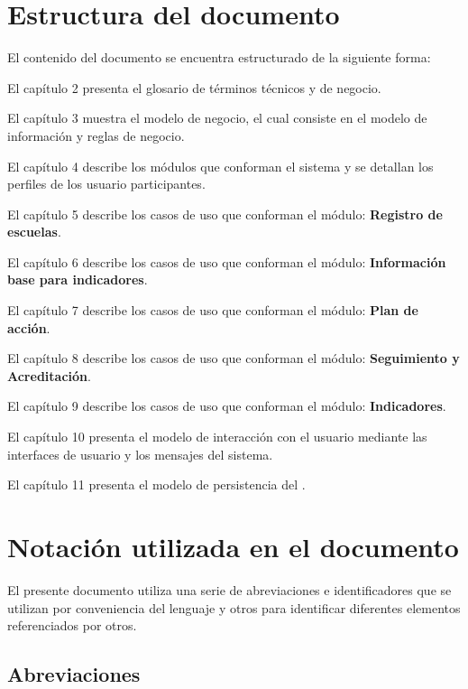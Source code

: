 \section{Estructura del documento}

    El contenido del documento se encuentra estructurado de la siguiente forma:

    \begin{Citemize}
	\item El capítulo 2 presenta el glosario de términos técnicos y de negocio.
	\item El capítulo 3 muestra el modelo de negocio, el cual consiste en el modelo de información y reglas de negocio.
	\item El capítulo 4 describe los módulos que conforman el sistema y se detallan los perfiles de los usuario participantes.
	\item El capítulo 5 describe los casos de uso que conforman el módulo: {\bf Registro de escuelas}.
	\item El capítulo 6 describe los casos de uso que conforman el módulo: {\bf Información base para indicadores}.
	\item El capítulo 7 describe los casos de uso que conforman el módulo: {\bf Plan de acción}.
	\item El capítulo 8 describe los casos de uso que conforman el módulo: {\bf Seguimiento y Acreditación}.
	\item El capítulo 9 describe los casos de uso que conforman el módulo: {\bf Indicadores}.	
	\item El capítulo 10 presenta el modelo de interacción con el usuario mediante las interfaces de usuario y los mensajes del sistema.
	\item El capítulo 11 presenta el modelo de persistencia del \saear.
    \end{Citemize}

\section{Notación utilizada en el documento}

    El presente documento utiliza una serie de abreviaciones e identificadores que se utilizan por conveniencia del lenguaje y otros para identificar diferentes elementos referenciados por otros.

    \subsection{Abreviaciones}

